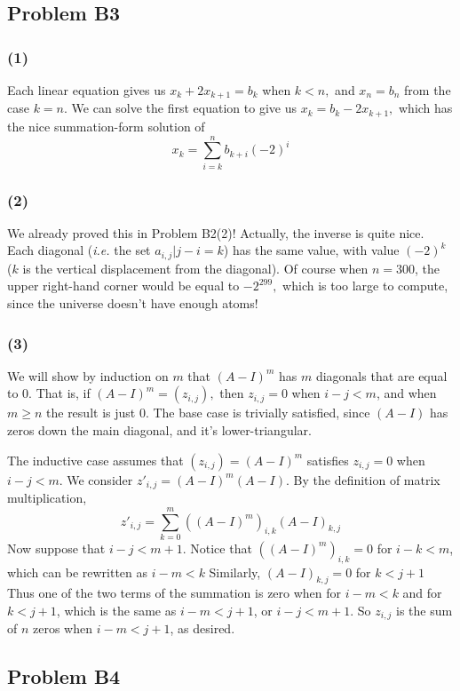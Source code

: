 \documentclass{article}
\begin{document}
\subsection{Problem B3}
\subsubsection{(1)}
Each linear equation gives us $x_k + 2x_{k+1} = b_k$ when $k < n,$ and
$x_n = b_n$ from the case $k = n.$ We can solve the first equation to give us
$x_k = b_k - 2x_{k+1},$ which has the nice summation-form solution of
\[x_k  = \sum_{i=k}^nb_{k+i}(-2)^i\]

\subsubsection{(2)}
We already proved this in Problem B2(2)!
Actually, the inverse is quite nice. Each diagonal (\emph{i.e.} the set
${a_{i,j}|j-i=k}$) has the same value, with value $(-2)^k$ ($k$ is the vertical
displacement from the diagonal).
Of course when $n=300$, the upper right-hand corner would be equal to
$-2^{299},$ which is too large to compute, since the universe doesn't have
enough atoms!

\subsubsection{(3)}
We will show by induction on $m$ that $(A-I)^m$ has $m$ diagonals that are equal
to 0. That is, if $(A-I)^m = (z_{i,j}),$ then $z_{i,j} = 0$ when $i - j < m$,
and when $m \geq n$ the result is just 0.
The base case is trivially satisfied, since $(A-I)$ has zeros down the main
diagonal, and it's lower-triangular.

The inductive case assumes that $(z_{i,j}) = (A-I)^m$ satisfies 
$z_{i,j} = 0$ when $i - j < m$.
We consider $z'_{i,j} = (A-I)^m(A-I).$
By the definition of matrix multiplication, 
\[z'_{i,j} = \sum_{k=0}^m ((A-I)^m)_{i,k}(A-I)_{k,j}\]
Now suppose that $i - j < m + 1.$
Notice that $((A - I)^m)_{i,k} = 0$ for $i - k < m$, which can be rewritten as
$i - m < k$
Similarly, $(A - I)_{k,j} = 0$ for $k < j + 1$
Thus one of the two terms of the summation is zero when for $i - m < k$ and
for $k < j + 1$, which is the same as $i - m < j + 1$, or $i - j < m + 1$.
So $z_{i,j}$ is the sum of $n$ zeros when $i - m < j + 1$, as desired.

\subsection{Problem B4}
\end{document}
